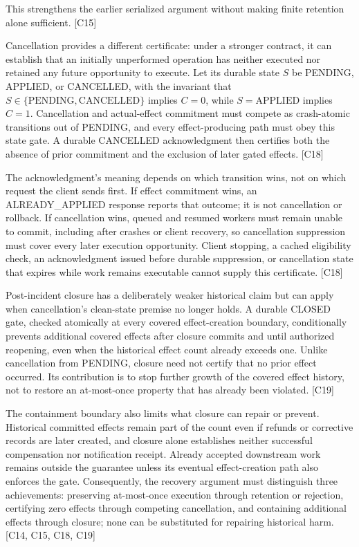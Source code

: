 \documentclass[11pt]{article}
\begin{document}
This strengthens the earlier serialized argument without making finite retention alone sufficient. [C15]

Cancellation provides a different certificate: under a stronger contract, it can establish that an initially unperformed operation has neither executed nor retained any future opportunity to execute. Let its durable state $S$ be PENDING, APPLIED, or CANCELLED, with the invariant that $S\in\{\mathrm{PENDING},\mathrm{CANCELLED}\}$ implies $C=0$, while $S=\mathrm{APPLIED}$ implies $C=1$. Cancellation and actual-effect commitment must compete as crash-atomic transitions out of PENDING, and every effect-producing path must obey this state gate. A durable CANCELLED acknowledgment then certifies both the absence of prior commitment and the exclusion of later gated effects. [C18]

The acknowledgment\textquoteright{}s meaning depends on which transition wins, not on which request the client sends first. If effect commitment wins, an ALREADY\_\allowbreak{}APPLIED response reports that outcome; it is not cancellation or rollback. If cancellation wins, queued and resumed workers must remain unable to commit, including after crashes or client recovery, so cancellation suppression must cover every later execution opportunity. Client stopping, a cached eligibility check, an acknowledgment issued before durable suppression, or cancellation state that expires while work remains executable cannot supply this certificate. [C18]

Post-incident closure has a deliberately weaker historical claim but can apply when cancellation\textquoteright{}s clean-state premise no longer holds. A durable CLOSED gate, checked atomically at every covered effect-creation boundary, conditionally prevents additional covered effects after closure commits and until authorized reopening, even when the historical effect count already exceeds one. Unlike cancellation from PENDING, closure need not certify that no prior effect occurred. Its contribution is to stop further growth of the covered effect history, not to restore an at-most-once property that has already been violated. [C19]

The containment boundary also limits what closure can repair or prevent. Historical committed effects remain part of the count even if refunds or corrective records are later created, and closure alone establishes neither successful compensation nor notification receipt. Already accepted downstream work remains outside the guarantee unless its eventual effect-creation path also enforces the gate. Consequently, the recovery argument must distinguish three achievements: preserving at-most-once execution through retention or rejection, certifying zero effects through competing cancellation, and containing additional effects through closure; none can be substituted for repairing historical harm. [C14, C15, C18, C19]
\end{document}
